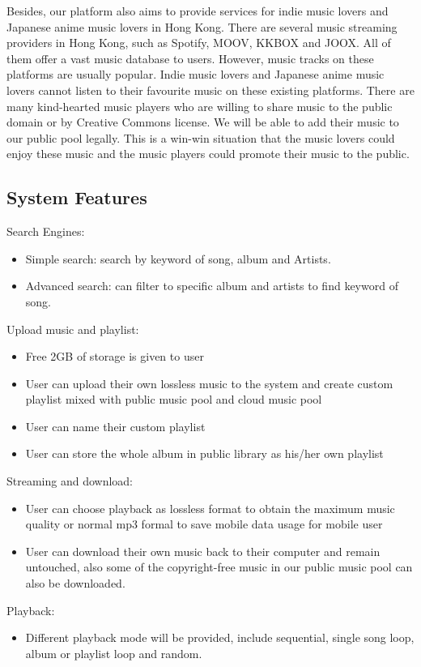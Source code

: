 \documentclass[12pt, a4paper, oneside]{article}
\newcommand{\env}[2]{\begin{#1}#2\end{#1}}
\begin{document}
Besides, our platform also aims to provide services for indie music lovers and Japanese anime
music lovers in Hong Kong. There are several music streaming providers in Hong Kong, such as
Spotify, MOOV, KKBOX and JOOX. All of them offer a vast music database to users. However,
music tracks on these platforms are usually popular. Indie music lovers and Japanese anime music
lovers cannot listen to their favourite music on these existing platforms. There are many
kind-hearted music players who are willing to share music to the public domain or by Creative
Commons license. We will be able to add their music to our public pool legally.
This is a win-win situation that the music lovers could enjoy these music and the music players
could promote their music to the public.\\

\newpage
\subsection{System Features}

\noindent Search Engines: \env{itemize} {
\item Simple search: search by keyword of song, album and Artists.
\item Advanced search: can filter to specific album and artists to find keyword of song.
}

\noindent Upload music and playlist: \env{itemize} {
\item Free 2GB of storage is given to user 
\item User can upload their own lossless music to the system and create custom playlist mixed
    with public music pool and cloud music pool
\item User can name their custom playlist
\item User can store the whole album in public library as his/her own playlist
}

\noindent Streaming and download: \env{itemize} {
\item User can choose playback as lossless format to obtain the maximum music quality
    or normal mp3 formal to save mobile data usage for mobile user  
\item User can download their own music back to their computer and remain untouched,
    also some of the copyright-free music in our public music pool can also be downloaded.
}

\noindent Playback: \env{itemize} {
\item Different playback mode will be provided, include sequential,
    single song loop, album or playlist loop and random.
}
\end{document}
